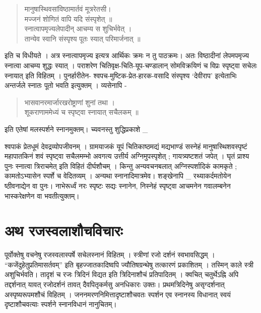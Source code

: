 \begin{verse}
मानुषास्थिवसांविष्ठामार्तवं मूत्ररेतसी। \\
मज्जनं शोणितं वापि यदि संस्पृशेत् ॥ \\
स्नात्वापमृज्यलेपादीन् आचम्य स शुचिर्भवेत् ।\\ 
तान्येव स्वानि संस्पृश्य पूतः स्यात् परिमार्जनात् ॥
\end{verse}
इति च विधीयते । अत्र स्नात्वापमृज्य इत्यत्र आर्थिकः क्रमः न तु पाठक्रमः। अतः विष्ठादीनां लेपमपमृज्य स्नात्वा आचम्य शुद्धः स्यात् । पराशरेण चितिवृक्ष-चिति-यूप-चण्डालान् सोमविक्रयिणं च विप्रः स्पृष्ट्वा सचेलः स्नायात् इति विहितम् । पुनर्हारीतेन- श्वपच-मुष्टिक-प्रेत-हारक-वसादि संस्पृश्य ‘देवीराप’ इत्येताभिः अन्तर्जले स्नातः पूतो भवति इत्युक्तम् । व्यसेनापि - 
\begin{verse}
भासवानरमार्जारखरोष्ट्राणां शुनां तथा ।\\
शूकराणाममेध्यं च स्पृष्ट्वा स्नायात् सचैलकम् ॥  
\end{verse}
इति एतेषां मलस्पर्शने स्नानमुक्तम्। च्यवनस्तु शुद्धिप्रकाशे _ 

श्वपाकं प्रेतधूमं देवद्रव्योपजीवनम् । ग्रामयाजकं यूपं चितिकाष्ठमद्यं मद्यभाण्डं सस्नेहं मानुषास्थिशवस्पृष्टं महापातकिनं शवं स्पृष्ट्वा सचैलमम्भो अवगत्य उत्तीर्य अग्निमुपस्पृशेत् ; गायत्र्यष्टशतं जपेत् । घृतं प्राश्य पुनः स्नात्वा त्रिराचमेत् इति विहितं दीर्घशौचम् । किन्तु अन्यवचनबलात् अग्निस्पर्शादिकं कामकृते ; कामतोऽभ्यासेन स्पर्शे च वेदितव्यम् । अन्यथा स्नानादिमात्रमेव। शङ्खेनापि _  रथ्याकर्दमतोयेन ष्ठीवनाद्येन वा पुनः। नाभेरूर्ध्वं नरः स्पृष्टः सद्यः स्नानेन, निस्नेहं स्पृष्ट्वा आचमनेन गवालम्बनेन भास्करेक्षणेन वा भवतीत्युक्तम्।

\section*{अथ रजस्वलाशौचविचारः}

पूर्वोक्तेषु वचनेषु रजस्वलास्पर्षे सचेलस्नानं विहितम् । स्त्रीणां रजो दर्शनं स्वभावसिद्धम् । “कजेंदुहेतुप्रतिमासर्तवम्” इति बृहज्जातकादिष्वपि ज्यौतिषग्रन्थेषु तत्कारणं प्रकाशितम् । तस्मिन् काले स्त्री अशुचिर्भवति। तादृशं च रजः त्रिदिनं विद्यत इति त्रिदिनाशौचं प्रतिपादितम् । क्वचित् चतुर्थेऽह्नि अपि तद्दर्शनात् यावत् रजोदर्शनं तावत् दैवपितृकर्मसु अनधिकारः उक्तः। प्रथमत्रिदिनेषु असृग्दर्शनात् अस्पृष्यरूपमशौचं विहितम् । जननमरणनिमित्तादृष्टाशौचवतः स्पर्शन एव स्नानस्य विधानात् स्वयं दृष्टाशौचवत्याः स्पर्शने स्नानविधानं नानुचितम्।

